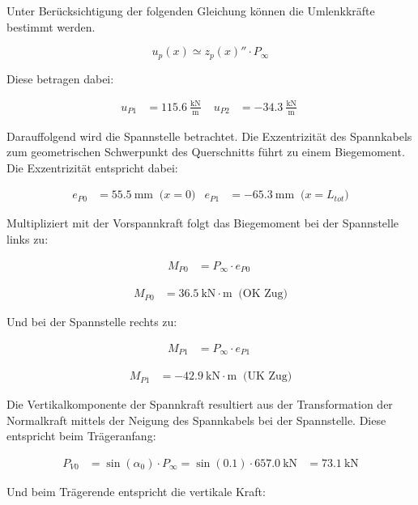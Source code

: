 \documentclass[
  11pt,
  letterpaper,
]{scrreprt}
\begin{document}
Unter Berücksichtigung der folgenden Gleichung können die Umlenkkräfte
bestimmt werden.

\[
u_p(x) \simeq z_p(x)'' \cdot P_{\infty}
\]

Diese betragen dabei:

$$
\begin{aligned}
u_{P1} &= 115.6\ \frac{\mathrm{kN}}{\mathrm{m}} \; 
 &u_{P2} &= -34.3\ \frac{\mathrm{kN}}{\mathrm{m}} \;
\end{aligned}
$$

Darauffolgend wird die Spannstelle betrachtet. Die Exzentrizität des
Spannkabels zum geometrischen Schwerpunkt des Querschnitts führt zu
einem Biegemoment. Die Exzentrizität entspricht dabei:

$$
\begin{aligned}
e_{P0} &= 55.5\ \mathrm{mm} \; \;\textrm{($x=0$)}
 &e_{P1} &= -65.3\ \mathrm{mm} \; \;\textrm{($x=L_{tot}$)}
\end{aligned}
$$

Multipliziert mit der Vorspannkraft folgt das Biegemoment bei der
Spannstelle links zu:

$$
\begin{aligned}
M_{P0} &= P_{\infty} \cdot e_{P0} \; 
\end{aligned}
$$

$$
\begin{aligned}
M_{P0} &= 36.5\ \mathrm{kN} \cdot \mathrm{m} \; \;\textrm{(OK Zug)}
\end{aligned}
$$

Und bei der Spannstelle rechts zu:

$$
\begin{aligned}
M_{P1} &= P_{\infty} \cdot e_{P1} \; 
\end{aligned}
$$

$$
\begin{aligned}
M_{P1} &= -42.9\ \mathrm{kN} \cdot \mathrm{m} \; \;\textrm{(UK Zug)}
\end{aligned}
$$

Die Vertikalkomponente der Spannkraft resultiert aus der Transformation
der Normalkraft mittels der Neigung des Spannkabels bei der Spannstelle.
Diese entspricht beim Trägeranfang:

$$
\begin{aligned}
P_{V0} &= \sin \left( \alpha_{0} \right) \cdot P_{\infty}  = \sin \left( 0.1 \right) \cdot 657.0\ \mathrm{kN} &= 73.1\ \mathrm{kN}  
\end{aligned}
$$

Und beim Trägerende entspricht die vertikale Kraft:
\end{document}
